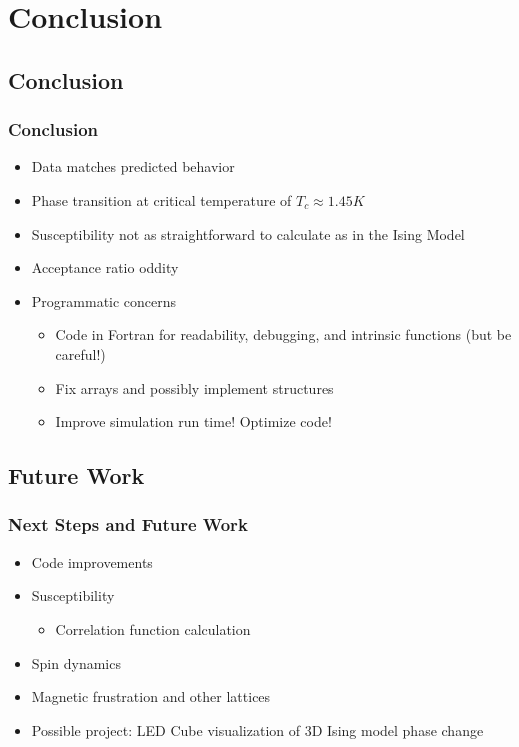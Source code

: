 \documentclass{beamer}
\begin{document}
  \section{Conclusion}
  \subsection*{Conclusion}
  \begin{frame}
    \frametitle{Conclusion}
    \begin{itemize}
      \item Data matches predicted behavior
      \item Phase transition at critical temperature of $T_c \approx 1.45 K$
    	\item Susceptibility not as straightforward to calculate as in the Ising Model
    	\item Acceptance ratio oddity
    	\item Programmatic concerns
    	\begin{itemize}
    		\item Code in Fortran for readability, debugging, and intrinsic functions (but be careful!)
    		\item Fix arrays and possibly implement structures
    		\item Improve simulation run time! Optimize code!
    	\end{itemize}
    \end{itemize}
  \end{frame}
  
  \subsection*{Future Work}
  \begin{frame}
    \frametitle{Next Steps and Future Work}
    \begin{itemize}
      \item Code improvements
    	\item Susceptibility
    	\begin{itemize}
    		\item Correlation function calculation    	
    	\end{itemize}
    	\item Spin dynamics
    	\item Magnetic frustration and other lattices
    	\item Possible project: LED Cube visualization of 3D Ising model phase change
    \end{itemize}
  \end{frame}
\end{document}
